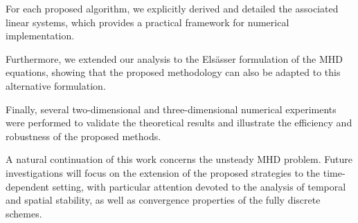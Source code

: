 \documentclass[3p]{elsarticle}
\begin{document}
For each proposed algorithm, we explicitly derived and detailed the associated linear systems, which provides a practical framework for numerical implementation.

Furthermore, we extended our analysis to the Elsässer formulation of the MHD equations, showing that the proposed methodology can also be adapted to this alternative formulation.

Finally, several two-dimensional and three-dimensional numerical experiments were performed to validate the theoretical results and illustrate the efficiency and robustness of the proposed methods.

A natural continuation of this work concerns the unsteady MHD problem. Future investigations will focus on the extension of the proposed strategies to the time-dependent setting, with particular attention devoted to the analysis of temporal and spatial stability, as well as convergence properties of the fully discrete schemes.


%

%
%
\end{document}
